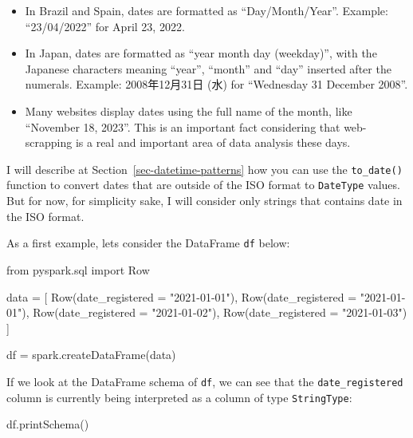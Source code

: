 \documentclass[
  11pt,
  letterpaper,
  DIV=11,
  numbers=noendperiod]{scrreprt}
\newenvironment{Shaded}{\begin{snugshade}}{\end{snugshade}}
\newcommand{\ImportTok}[1]{\textcolor[rgb]{0.00,0.46,0.62}{#1}}
\newcommand{\NormalTok}[1]{\textcolor[rgb]{0.00,0.23,0.31}{#1}}
\newcommand{\OperatorTok}[1]{\textcolor[rgb]{0.37,0.37,0.37}{#1}}
\newcommand{\StringTok}[1]{\textcolor[rgb]{0.13,0.47,0.30}{#1}}
\providecommand{\tightlist}{%
  \setlength{\itemsep}{0pt}\setlength{\parskip}{0pt}}\usepackage{longtable,booktabs,array}
\begin{document}
\begin{itemize}
\tightlist
\item
  In Brazil and Spain, dates are formatted as ``Day/Month/Year''.
  Example: ``23/04/2022'' for April 23, 2022.
\item
  In Japan, dates are formatted as ``year month day (weekday)'', with
  the Japanese characters meaning ``year'', ``month'' and ``day''
  inserted after the numerals. Example: 2008年12月31日 (水) for
  ``Wednesday 31 December 2008''.
\item
  Many websites display dates using the full name of the month, like
  ``November 18, 2023''. This is an important fact considering that
  web-scrapping is a real and important area of data analysis these
  days.
\end{itemize}

I will describe at Section~\ref{sec-datetime-patterns} how you can use
the \texttt{to\_date()} function to convert dates that are outside of
the ISO format to \texttt{DateType} values. But for now, for simplicity
sake, I will consider only strings that contains date in the ISO format.

As a first example, lets consider the DataFrame \texttt{df} below:

\begin{Shaded}
\begin{Highlighting}[]
\ImportTok{from}\NormalTok{ pyspark.sql }\ImportTok{import}\NormalTok{ Row}

\NormalTok{data }\OperatorTok{=}\NormalTok{ [}
\NormalTok{    Row(date\_registered }\OperatorTok{=} \StringTok{"2021{-}01{-}01"}\NormalTok{),}
\NormalTok{    Row(date\_registered }\OperatorTok{=} \StringTok{"2021{-}01{-}01"}\NormalTok{),}
\NormalTok{    Row(date\_registered }\OperatorTok{=} \StringTok{"2021{-}01{-}02"}\NormalTok{),}
\NormalTok{    Row(date\_registered }\OperatorTok{=} \StringTok{"2021{-}01{-}03"}\NormalTok{)}
\NormalTok{]}

\NormalTok{df }\OperatorTok{=}\NormalTok{ spark.createDataFrame(data)}
\end{Highlighting}
\end{Shaded}

If we look at the DataFrame schema of \texttt{df}, we can see that the
\texttt{date\_registered} column is currently being interpreted as a
column of type \texttt{StringType}:

\begin{Shaded}
\begin{Highlighting}[]
\NormalTok{df.printSchema()}
\end{Highlighting}
\end{Shaded}
\end{document}
